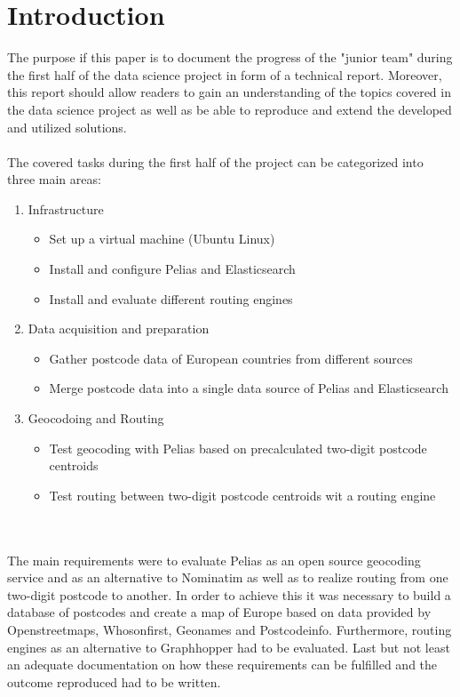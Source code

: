 
\section{Introduction}
The purpose if this paper is to document the progress of the "junior team" during the first half of the data science project in form of a technical report. Moreover, this report should allow readers to gain an understanding of the topics covered in the data science project as well as be able to reproduce and extend the developed and utilized solutions.
\\\\
The covered tasks during the first half of the project can be categorized into three main areas:
\begin{enumerate}
\item Infrastructure
\begin{itemize}
\item Set up a virtual machine (Ubuntu Linux)
\item Install and configure Pelias and Elasticsearch
\item Install and evaluate different routing engines
\end{itemize}
\item Data acquisition and preparation
\begin{itemize}
\item Gather postcode data of European countries from different sources
\item Merge postcode data into a single data source of Pelias and Elasticsearch
\end{itemize}
\item Geocodoing and Routing
\begin{itemize}
\item Test geocoding with Pelias based on precalculated two-digit postcode centroids
\item Test routing between two-digit postcode centroids wit a routing engine
\end{itemize}
\end{enumerate}
\\\\
The main requirements were to evaluate Pelias as an open source geocoding service and as an alternative to Nominatim as well as to realize routing from one two-digit postcode to another. In order to achieve this it was necessary to build a database of postcodes and create a map of Europe based on data provided by Openstreetmaps, Whosonfirst, Geonames and Postcodeinfo. Furthermore, routing engines as an alternative to Graphhopper had to be evaluated. Last but not least an adequate documentation on how these requirements can be fulfilled and the outcome reproduced had to be written.